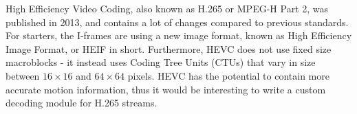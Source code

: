 \documentclass[11pt,english]{report}
\begin{document}
High Efficiency Video Coding, also known as H.265 or MPEG-H Part 2, was published in 2013, and contains a lot of changes compared to previous standards. For starters, the I-frames are using a new image format, known as High Efficiency Image Format, or HEIF in short. Furthermore, HEVC does not use fixed size macroblocks - it instead uses Coding Tree Units (CTUs) that vary in size between $16 \times 16$ and $64 \times 64$ pixels\cite{h265}.
HEVC has the potential to contain more accurate motion information, thus it would be interesting to write a custom decoding module for H.265 streams.

\printbibliography
\end{document}
